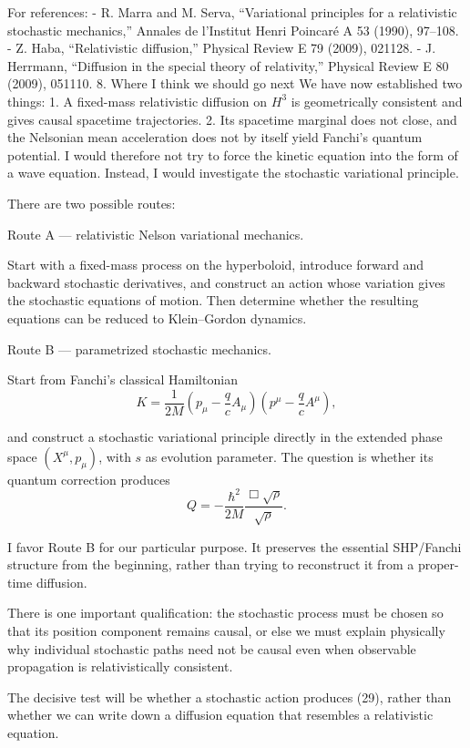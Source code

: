 For references:
- R. Marra and M. Serva, “Variational principles for a relativistic stochastic mechanics,” Annales de l'Institut Henri Poincaré A 53 (1990), 97–108.
- Z. Haba, “Relativistic diffusion,” Physical Review E 79 (2009), 021128.
- J. Herrmann, “Diffusion in the special theory of relativity,” Physical Review E 80 (2009), 051110.
8. Where I think we should go next
We have now established two things:
1. A fixed-mass relativistic diffusion on \(H^3\) is geometrically consistent and gives causal spacetime trajectories.
2. Its spacetime marginal does not close, and the Nelsonian mean acceleration does not by itself yield Fanchi's quantum potential.
I would therefore not try to force the kinetic equation into the form of a wave equation. Instead, I would investigate the stochastic variational principle.

There are two possible routes:

Route A — relativistic Nelson variational mechanics.

Start with a fixed-mass process on the hyperboloid, introduce forward and backward stochastic derivatives, and construct an action whose variation gives the stochastic equations of motion. Then determine whether the resulting equations can be reduced to Klein–Gordon dynamics.

Route B — parametrized stochastic mechanics.

Start from Fanchi's classical Hamiltonian
\[
K=\frac{1}{2M}
\left(p_\mu-\frac qc A_\mu\right)
\left(p^\mu-\frac qc A^\mu\right),
\tag{28}
\]

and construct a stochastic variational principle directly in the extended phase space \((X^\mu,p_\mu)\), with \(s\) as evolution parameter. The question is whether its quantum correction produces
\[
Q=-\frac{\hbar^2}{2M}
\frac{\Box\sqrt{\rho}}{\sqrt{\rho}}.
\tag{29}
\]

I favor Route B for our particular purpose. It preserves the essential SHP/Fanchi structure from the beginning, rather than trying to reconstruct it from a proper-time diffusion.

There is one important qualification: the stochastic process must be chosen so that its position component remains causal, or else we must explain physically why individual stochastic paths need not be causal even when observable propagation is relativistically consistent.

The decisive test will be whether a stochastic action produces (29), rather than whether we can write down a diffusion equation that resembles a relativistic equation.

